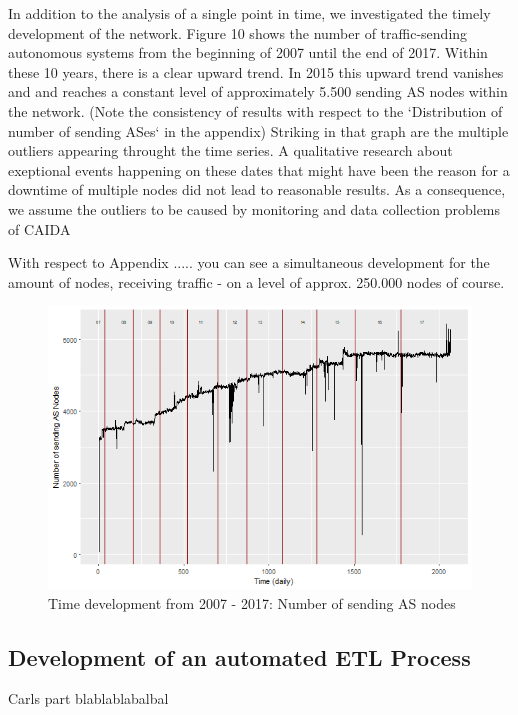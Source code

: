 \documentclass[conference, 11pt]{IEEEtran}
\begin{document}
In addition to the analysis of a single point in time, we investigated the timely development of the network. Figure 10 shows the number of traffic-sending autonomous systems from the beginning of 2007 until the end of 2017. Within these 10 years, there is a clear upward trend. In 2015 this upward trend vanishes and and reaches a constant level of approximately 5.500 sending AS nodes within the network. (Note the consistency of results with respect to  the `Distribution of number of sending ASes` in the appendix) Striking in that graph are the multiple outliers appearing throught the time series. A qualitative research about exeptional events happening on these dates that might have been the reason for a downtime of multiple nodes did not lead to reasonable results. As a consequence, we assume the outliers to be caused by monitoring and data collection problems of CAIDA \cite{CaidaDataCollection}

With respect to Appendix .....  you can see a simultaneous development for the amount of nodes, receiving traffic - on a level of approx. 250.000 nodes of course. 


\begin{figure}[htbp]
\centerline{\includegraphics[scale=0.4]{Graphics/ASFromAll.png}}
\caption{Time development from 2007 - 2017: Number of sending AS nodes}
\label{fig}
\end{figure}


\subsection{Development of an automated ETL Process}

Carls part blablablabalbal
\end{document}
